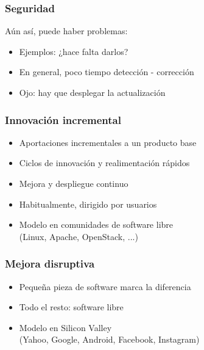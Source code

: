 \documentclass[17pt,aspectratio=169]{beamer}
\begin{document}

\begin{frame}
\frametitle{Seguridad}

Aún así, puede haber problemas:

\begin{itemize}
\item Ejemplos: ¿hace falta darlos?
\item En general, poco tiempo detección - corrección
\item Ojo: hay que desplegar la actualización
\end{itemize}
\end{frame}


\begin{frame}
\frametitle{Innovación incremental}

\begin{itemize}
\item Aportaciones incrementales a un producto base
\item Ciclos de innovación y realimentación rápidos
\item Mejora y despliegue continuo
\item Habitualmente, dirigido por usuarios
\item Modelo en comunidades de software libre \\
  (Linux, Apache, OpenStack, ...) \\
\end{itemize}

\end{frame}


\begin{frame}
\frametitle{Mejora disruptiva}

\begin{itemize}
\item Pequeña pieza de software marca la diferencia
\item Todo el resto: software libre
\item Modelo en Silicon Valley \\
  (Yahoo, Google, Android, Facebook, Instagram) \\
\end{itemize}

\end{frame}
\end{document}
